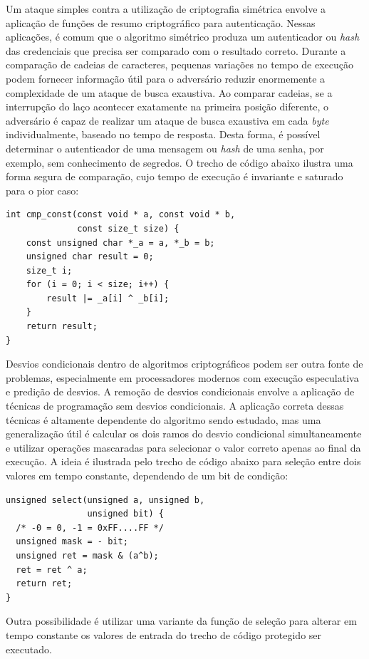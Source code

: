 \documentclass{SBCbookchapter}
\begin{document}
Um ataque simples contra a utilização de criptografia simétrica envolve a aplicação de funções de resumo criptográfico
para autenticação. Nessas aplicações, é comum que o algoritmo simétrico produza um autenticador ou \emph{hash} das credenciais
que precisa ser comparado com o resultado correto. Durante a comparação de cadeias de caracteres,
pequenas variações no tempo de execução podem fornecer informação útil para o adversário reduzir enormemente a complexidade de um
ataque de busca exaustiva. Ao comparar cadeias, se a interrupção do laço acontecer exatamente na primeira posição diferente,
o adversário é capaz de realizar um ataque de busca exaustiva em cada \emph{byte} individualmente,
baseado no tempo de resposta. Desta forma, é possível determinar o autenticador de uma mensagem ou \emph{hash} de uma senha, por exemplo,
sem conhecimento de segredos. O trecho de código abaixo ilustra uma forma segura de comparação, cujo tempo de execução é invariante e saturado para o pior caso:

\begin{center}
\begin{verbatim}
int cmp_const(const void * a, const void * b,
              const size_t size) {
    const unsigned char *_a = a, *_b = b;
    unsigned char result = 0;
    size_t i;
    for (i = 0; i < size; i++) {
        result |= _a[i] ^ _b[i];
    }
    return result;
}
\end{verbatim}
\end{center}

Desvios condicionais dentro de algoritmos criptográficos podem ser outra fonte de problemas, 
especialmente em processadores modernos com execução especulativa e predição de desvios.
A remoção de desvios condicionais envolve a aplicação de técnicas de programação sem desvios condicionais.
A aplicação correta dessas técnicas é altamente dependente do algoritmo sendo estudado, mas uma
generalização útil é calcular os dois ramos do desvio condicional simultaneamente e utilizar
operações mascaradas para selecionar o valor correto apenas ao final da execução. A ideia é ilustrada pelo
trecho de código abaixo para seleção entre dois valores em tempo constante, dependendo de um bit de condição:

\begin{center}
\begin{verbatim}
unsigned select(unsigned a, unsigned b,
                unsigned bit) {
  /* -0 = 0, -1 = 0xFF....FF */
  unsigned mask = - bit;
  unsigned ret = mask & (a^b);
  ret = ret ^ a;
  return ret;
}
\end{verbatim}
\end{center}
Outra possibilidade é utilizar uma variante da função de seleção para alterar em tempo constante os valores de entrada do trecho de código
protegido ser executado.
\end{document}
